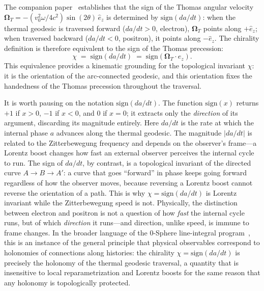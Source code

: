 \documentclass[%
 reprint, amsmath,amssymb, aps, prb, ]{revtex4-2}
\numberwithin{equation}{section}
\newcommand{\iphase}{\theta}
\begin{document}
The companion paper~\cite{hanamura49} establishes that the sign of the Thomas angular velocity $\boldsymbol{\Omega}_T = -(v_0^2\omega/4c^2)\sin(2\iphase)\,\hat{e}_z$ is determined by $\text{sign}(da/dt)$: when the thermal geodesic is traversed forward ($da/dt > 0$, electron), $\boldsymbol{\Omega}_T$ points along $+\hat{e}_z$; when traversed backward ($da/dt < 0$, positron), it points along $-\hat{e}_z$. The chirality definition is therefore equivalent to the sign of the Thomas precession:
\begin{equation}
\chi \;=\; \text{sign}(da/dt) \;=\; \text{sign}(\boldsymbol{\Omega}_T \cdot \hat{e}_z).
\label{eq:chirality_thomas}
\end{equation}
This equivalence provides a kinematic grounding for the topological invariant $\chi$: it is the orientation of the arc-connected geodesic, and this orientation fixes the handedness of the Thomas precession throughout the traversal.

It is worth pausing on the notation $\text{sign}(da/dt)$.
The function $\text{sign}(x)$ returns $+1$ if $x>0$, $-1$ if $x<0$, and $0$ if $x=0$; it extracts only the \emph{direction} of its argument, discarding its magnitude entirely.
Here $da/dt$ is the rate at which the internal phase $a$ advances along the thermal geodesic.
The magnitude $|da/dt|$ is related to the Zitterbewegung frequency and depends on the observer's frame---a Lorentz boost changes how fast an external observer perceives the internal cycle to run.
The sign of $da/dt$, by contrast, is a topological invariant of the directed curve $A\to B\to A'$: a curve that goes ``forward'' in phase keeps going forward regardless of how the observer moves, because reversing a Lorentz boost cannot reverse the orientation of a path.
This is why $\chi = \text{sign}(da/dt)$ is Lorentz invariant while the Zitterbewegung speed is not.
Physically, the distinction between electron and positron is not a question of how \emph{fast} the internal cycle runs, but of which \emph{direction} it runs---and direction, unlike speed, is immune to frame changes. In the broader language of the 0-Sphere line-integral program~\cite{hanamura31}, this is an instance of the general principle that physical observables correspond to holonomies of connections along histories: the chirality $\chi = \text{sign}(da/dt)$ is precisely the holonomy of the thermal geodesic traversal, a quantity that is insensitive to local reparametrization and Lorentz boosts for the same reason that any holonomy is topologically protected.
\end{document}
